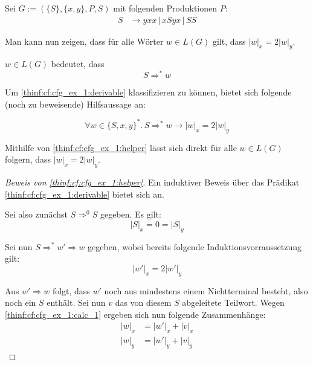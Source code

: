 \begin{example}
	\label{thinf:cf:cfg_ex_1}
	Sei $G := (\{S\},\{x,y\},P,S)$ mit folgenden Produktionen $P$:
	\begin{align*}
		\label{thinf:cf:cfg_ex_1:gramm}
		S & \rightarrow yxx \,|\, xSyx \,|\, SS
	\end{align*}

	Man kann nun zeigen, dass für alle Wörter $w \in L(G)$ gilt, dass $|w|_x
	= 2 |w|_y$.

	$w \in L(G)$ bedeutet, dass
	\begin{equation}
		\label{thinf:cf:cfg_ex_1:derivable}
		S \Longrightarrow^* w
	\end{equation}

	Um \eqref{thinf:cf:cfg_ex_1:derivable} klassifizieren zu können, bietet sich
	folgende (noch zu beweisende) Hilfsaussage an:

	\begin{equation}
		\label{thinf:cf:cfg_ex_1:helper}
		\forall w \in \{S,x,y\}^*.\, S \Longrightarrow^* w \rightarrow |w|_x
		= 2|w|_y
	\end{equation}

	Mithilfe von \eqref{thinf:cf:cfg_ex_1:helper} lässt sich direkt für alle $w
	\in L(G)$ folgern, dass $|w|_x = 2|w|_y$.

	\begin{proof}[Beweis von \eqref{thinf:cf:cfg_ex_1:helper}]
		Ein induktiver Beweis über das Prädikat
		\eqref{thinf:cf:cfg_ex_1:derivable} bietet sich an.

		Sei also zunächst $S \Longrightarrow^0 S$ gegeben. Es gilt:
		\begin{equation}
			\label{thinf:cf:cfg_ex_1:calc_1}
			|S|_x = 0 = |S|_y
		\end{equation}

		Sei nun $S \Longrightarrow^* w' \Longrightarrow w$ gegeben, wobei
		bereits folgende Induktionsvorraussetzung gilt:
		\begin{equation}
			\label{thinf:cf:cfg_ex_1:helper_iv}
			\tag{IV}
			|w'|_x = 2|w'|_y
		\end{equation}

		Aus $w' \Longrightarrow w$ folgt, dass $w'$ noch aus mindestens
		einem Nichtterminal besteht, also noch ein $S$ enthält. Sei nun
		$v$ das von diesem $S$ abgeleitete Teilwort. Wegen
		\eqref{thinf:cf:cfg_ex_1:calc_1} ergeben sich nun folgende
		Zusammenhänge:
		\begin{align}
			|w|_x & = |w'|_x + |v|_x \label{thinf:cf:cfg_ex_1:eq_1} \\
			|w|_y & = |w'|_y + |v|_y \label{thinf:cf:cfg_ex_1:eq_2}
		\end{align}


\end{proof}
\end{example}
